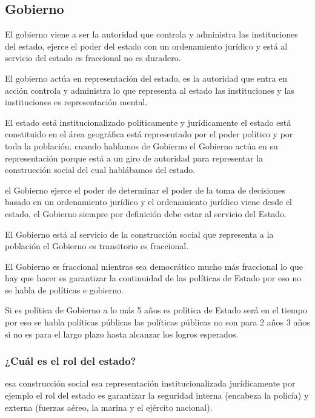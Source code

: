 \documentclass[
  jou,
  floatsintext,
  longtable,
  a4paper,
  nolmodern,
  notxfonts,
  notimes,
  12pt,
  colorlinks=true,linkcolor=blue,citecolor=blue,urlcolor=blue]{apa7}
\begin{document}
\subsection{Gobierno}\label{gobierno}

El gobierno viene a ser la autoridad que controla y administra las
instituciones del estado, ejerce el poder del estado con un ordenamiento
jurídico y está al servicio del estado es fraccional no es duradero.

El gobierno actúa en representación del estado, es la autoridad que
entra en acción controla y administra lo que representa al estado las
instituciones y las instituciones es representación mental.

El estado está institucionalizado políticamente y jurídicamente el
estado está constituido en el área geográfica está representado por el
poder político y por toda la población. cuando hablamos de Gobierno el
Gobierno actúa en su representación porque está a un giro de autoridad
para representar la construcción social del cual hablábamos del estado.

el Gobierno ejerce el poder de determinar el poder de la toma de
decisiones basado en un ordenamiento jurídico y el ordenamiento jurídico
viene desde el estado, el Gobierno siempre por definición debe estar al
servicio del Estado.

El Gobierno está al servicio de la construcción social que representa a
la población el Gobierno es transitorio es fraccional.

El Gobierno es fraccional mientras sea democrático mucho más fraccional
lo que hay que hacer es garantizar la continuidad de las políticas de
Estado por eso no se habla de políticas e gobierno.

Si es política de Gobierno a lo más 5 años es política de Estado será en
el tiempo por eso se habla políticas públicas las políticas públicas no
son para 2 años 3 años si no es para el largo plazo hasta alcanzar los
logros esperados.

\subsubsection{¿Cuál es el rol del
estado?}\label{cuuxe1l-es-el-rol-del-estado}

esa construcción social esa representación institucionalizada
jurídicamente por ejemplo el rol del estado es garantizar la seguridad
interna (encabeza la policía) y externa (fuerzas aéreo, la marina y el
ejército nacional).
\end{document}
